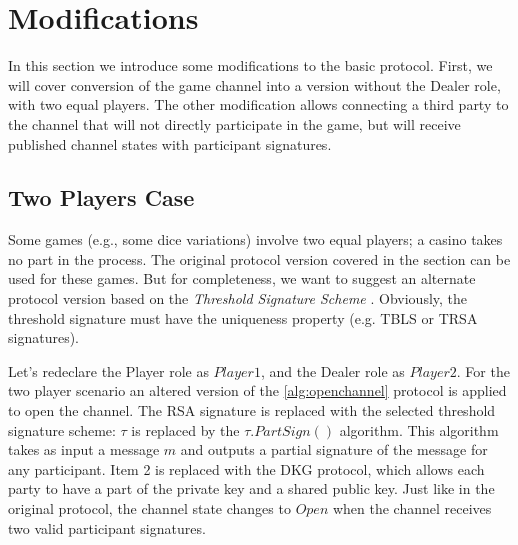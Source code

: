 \section{Modifications}
In this section we introduce some modifications to the basic protocol. First, we will cover conversion of the game channel into a version without the Dealer role, with two equal players. The other modification allows connecting a third party to the channel that will not directly participate in the game, but will receive published channel states with participant signatures. 

\subsection{Two Players Case}
Some games (e.g., some dice variations) involve two equal players; a casino takes no part in the process. The original protocol version covered in the  section can be used for these games. But for completeness, we want to suggest an alternate protocol version based on the  \textit {Threshold Signature Scheme} \cite{bib22}. Obviously, the threshold signature must have the uniqueness property (e.g. TBLS or TRSA \cite{bib23} signatures).

Let’s redeclare the Player role as $Player1$, and the Dealer role as $Player2$. For the two player scenario an altered version of the \autoref{alg:openchannel} protocol is applied to open the channel. The RSA signature is replaced with the selected threshold signature scheme: $ \tau $ is replaced by the $\tau.PartSign()$ algorithm. This algorithm takes as input a message $m$ and outputs a partial signature of the message for any participant. Item 2 is replaced with the DKG protocol, which allows each party to have a part of the private key and a shared public key. Just like in the original protocol, the channel state changes to $Open$ when the channel receives two valid participant signatures. 

